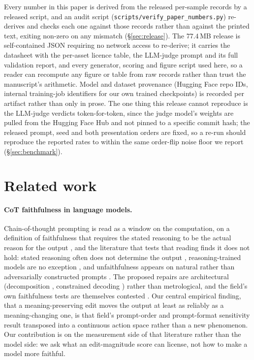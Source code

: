 \documentclass{article}
\begin{document}
Every number in this paper is derived from the released per-sample records by a released script, and an audit script (\texttt{scripts/verify\_paper\_numbers.py}) re-derives and checks each one against those records rather than against the printed text, exiting non-zero on any mismatch (\S\ref{sec:release}). The $77.4$\,MB release is self-contained JSON requiring no network access to re-derive; it carries the datasheet \citep{datasheets} with the per-asset licence table, the LLM-judge prompt and its full validation report, and every generator, scoring and figure script used here, so a reader can recompute any figure or table from raw records rather than trust the manuscript's arithmetic. Model and dataset provenance (Hugging Face repo IDs, internal training-job identifiers for our own trained checkpoints) is recorded per artifact rather than only in prose. The one thing this release cannot reproduce is the LLM-judge verdicts token-for-token, since the judge model's weights are pulled from the Hugging Face Hub and not pinned to a specific commit hash; the released prompt, seed and both presentation orders are fixed, so a re-run should reproduce the reported rates to within the same order-flip noise floor we report (\S\ref{sec:benchmark}).



\appendix

\section{Related work}
\label{sec:related}

\paragraph{CoT faithfulness in language models.} Chain-of-thought prompting \citep{wei2022cot} is read as a window on the computation, on a definition of faithfulness that requires the stated reasoning to be the actual reason for the output \citep{jacovigoldberg2020}, and the literature that tests that reading finds it does not hold: stated reasoning often does not determine the output \citep{turpin2023,lanham2023,ye2022unreliability}, reasoning-trained models are no exception \citep{chen2025reasoning}, and unfaithfulness appears on natural rather than adversarially constructed prompts \citep{arcuschin2025}. The proposed repairs are architectural (decomposition \citep{radhakrishnan2023}, constrained decoding \citep{lyu2023faithful}) rather than metrological, and the field's own faithfulness tests are themselves contested \citep{atanasova2023,parcalabescu2024,lyu2024survey}. Our central empirical finding, that a meaning-preserving edit moves the output at least as reliably as a meaning-changing one, is that field's prompt-order and prompt-format sensitivity result \citep{lu2022order,sclar2024,mizrahi2024} transposed into a continuous action space rather than a new phenomenon. Our contribution is on the measurement side of that literature rather than the model side: we ask what an edit-magnitude score can license, not how to make a model more faithful.
\end{document}
